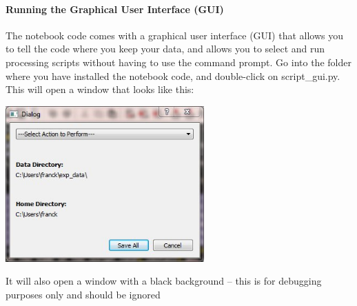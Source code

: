 \paragraph{Running the Graphical User Interface (GUI)}
The notebook code comes with a graphical user interface
    (GUI) that allows you to tell the
    code where you keep your data,
    and allows you to select and run processing scripts
    without having to use the command prompt.
Go into the folder where you have installed the notebook code,
    and double-click on script\_gui.py.
This will open a window that looks like this:
\begin{center}
    \includegraphics[width=3in]{sketches/script_gui.jpg}
\end{center}
It will also open a window with a black background --
    this is for debugging purposes only
    and should be ignored 
